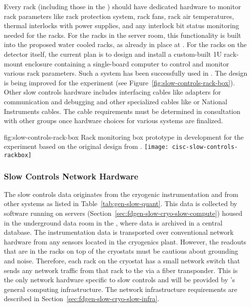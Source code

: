 Every rack (including those in the ) should have dedicated hardware to monitor rack parameters like rack protection system, rack fans, rack air temperatures, thermal interlocks with power supplies, and any interlock bit status monitoring needed for the racks. For the racks in the  server room, this functionality is built into the proposed water cooled racks, as already in place at .  For the racks on the detector itself, the current plan is to design and install a custom-built 1U rack-mount enclosure containing a single-board computer to control and monitor various rack parameters. Such a system has been successfully used in . The design is being improved for the  experiment (see Figure~\ref{fig:slow-controls-rack-box}). Other slow controls hardware includes interfacing cables like adapters for communication and debugging and other specialized cables like   or National Instruments cables. The cable requirements must be determined in consultation with other groups once hardware choices for various systems are finalized.

\begin{dunefigure}{fig:slow-controls-rack-box}
{Rack monitoring box prototype in development for the  experiment based on the original design from .}
\texttt{[image: cisc-slow-controls-rackbox]}
\end{dunefigure}


\subsubsection{Slow Controls Network Hardware}
\label{sec:fdgen-slow-cryo-slow-network}
The slow controls data originates from the cryogenic instrumentation and from other systems as listed in Table~\ref{tab:gen-slow-quant}. This data is collected by software running on servers
(Section~\ref{sec:fdgen-slow-cryo-slow-compute})
housed in the underground data room in the ,
where data is archived in a central  database.
The instrumentation data is transported over
conventional network hardware from any sensors located in the cryogenics
plant.  However, the readouts that are in the racks on top of the
cryostats must be cautious about grounding and noise.  Therefore, each
rack on the cryostat has a small network switch that sends
any network traffic from that rack to the  via a fiber transponder.
This is the only network hardware specific to slow controls and will be provided by %
's  
general computing infrastructure. %
The network infrastructure requirements are described in
Section~\ref{sec:fdgen-slow-cryo-slow-infra}.

